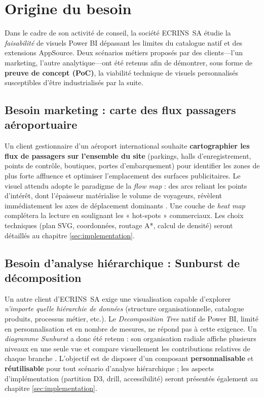 \section{Origine du besoin}
\label{sec:need-origin}

Dans le cadre de son activité de conseil, la société ECRINS~SA étudie la
\emph{faisabilité} de visuels Power BI dépassant les limites du catalogue
natif et des extensions AppSource.  
Deux scénarios métiers proposés par des clients—l’un marketing, l’autre
analytique—ont été retenus afin de démontrer, sous forme de
\textbf{preuve de concept (PoC)}, la viabilité technique de visuels
personnalisés susceptibles d’être industrialisés par la suite.

\subsection{Besoin marketing : carte des flux passagers aéroportuaire}
\label{subsec:need-marketing-flow}

Un client gestionnaire d’un aéroport international souhaite
\textbf{cartographier les flux de passagers sur l’ensemble du site}
(parkings, halls d’enregistrement, points de contrôle, boutiques,
portes d’embarquement) pour identifier les zones de plus forte
affluence et optimiser l’emplacement des surfaces publicitaires.  
Le visuel attendu adopte le paradigme de la \emph{flow map} : des arcs
reliant les points d’intérêt, dont l’épaisseur matérialise le volume de
voyageurs, révèlent immédiatement les axes de déplacement dominants
\parencite{GuoFlowMaps2011}.  
Une couche de \textit{heat map} complétera la lecture en soulignant les
« hot-spots » commerciaux.  
Les choix techniques (plan SVG, coordonnées, routage A*, calcul de densité)
seront détaillés au chapitre \ref{sec:implementation}.

\subsection{Besoin d’analyse hiérarchique : Sunburst de décomposition}
\label{subsec:need-hierarchical-sunburst}

Un autre client d’ECRINS~SA exige une visualisation capable
d’explorer \textit{n’importe quelle hiérarchie de données}
(structure organisationnelle, catalogue produits, processus métier, etc.).
Le \emph{Decomposition Tree} natif de Power BI, limité en personnalisation
et en nombre de mesures, ne répond pas à cette exigence.  
Un \textit{diagramme Sunburst} a donc été retenu : son organisation radiale
affiche plusieurs niveaux en une seule vue et compare visuellement les
contributions relatives de chaque branche
\parencite{StaskoSunburst2000}.  
L’objectif est de disposer d’un composant \textbf{personnalisable} et
\textbf{réutilisable} pour tout scénario d’analyse hiérarchique ; les
aspects d’implémentation (partition D3, drill, accessibilité) seront
présentés également au chapitre \ref{sec:implementation}.
